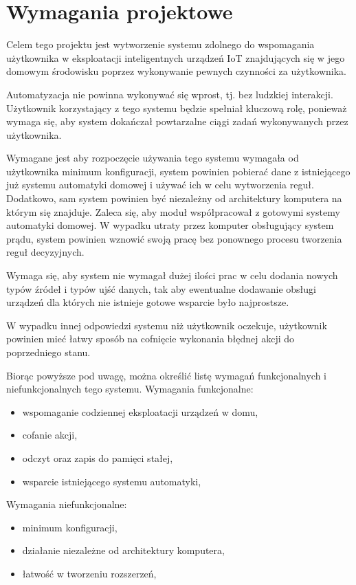 \chapter{Wymagania projektowe}
\label{chapter:wymagania}
Celem tego projektu jest wytworzenie systemu zdolnego do wspomagania użytkownika w eksploatacji inteligentnych urządzeń IoT znajdujących się w jego domowym środowisku poprzez wykonywanie pewnych czynności za użytkownika. 

Automatyzacja nie powinna wykonywać się wprost, tj. bez ludzkiej interakcji. Użytkownik korzystający z tego systemu będzie spełniał kluczową rolę, ponieważ wymaga się, aby system dokańczał powtarzalne ciągi zadań wykonywanych przez użytkownika.

Wymagane jest aby rozpoczęcie używania tego systemu wymagała od użytkownika minimum konfiguracji, system powinien pobierać dane z istniejącego już systemu automatyki domowej i używać ich w celu wytworzenia reguł. Dodatkowo, sam system powinien być niezależny od architektury komputera na którym się znajduje. Zaleca się, aby moduł współpracował z gotowymi systemy automatyki domowej. W wypadku utraty przez komputer obsługujący system prądu, system powinien wznowić swoją pracę bez ponownego procesu tworzenia reguł decyzyjnych.

Wymaga się, aby system nie wymagał dużej ilości prac w celu dodania nowych typów źródeł i typów ujść danych, tak aby ewentualne dodawanie obsługi urządzeń dla których nie istnieje gotowe wsparcie było najprostsze.

W wypadku innej odpowiedzi systemu niż użytkownik oczekuje, użytkownik powinien mieć łatwy sposób na cofnięcie wykonania błędnej akcji do poprzedniego stanu.

Biorąc powyższe pod uwagę, można określić listę wymagań funkcjonalnych i niefunkcjonalnych tego systemu.
Wymagania funkcjonalne:
\begin{itemize}
    \item wspomaganie codziennej eksploatacji urządzeń w domu,
    \item cofanie akcji,
    \item odczyt oraz zapis do pamięci stałej,
    \item wsparcie istniejącego systemu automatyki,
\end{itemize}
Wymagania niefunkcjonalne:
\begin{itemize}
    \item minimum konfiguracji,
    \item działanie niezależne od architektury komputera,
    \item łatwość w tworzeniu rozszerzeń,
\end{itemize}

